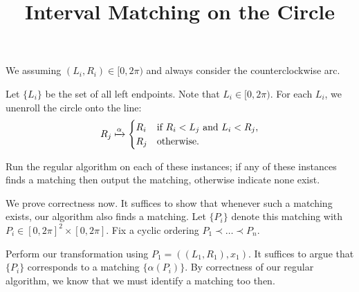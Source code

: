 \documentclass{article}
\title{Interval Matching on the Circle}
\begin{document}
\maketitle{}

We assuming $(L_i, R_i) \in [0, 2\pi)$ and always consider the counterclockwise arc.

Let $\{L_i\}$ be the set of all left endpoints. Note that $L_i \in [0, 2\pi)$. For each $L_i$, we unenroll the circle onto the line:
\begin{align*}
  R_j \xmapsto{\alpha} \begin{cases}
    R_i &\text{if } R_i < L_j \text{ and } L_i < R_j,\\
    R_j &\text{otherwise.}
  \end{cases}
\end{align*}

Run the regular algorithm on each of these instances; if any of these instances finds a matching then output the matching, otherwise indicate none exist.

We prove correctness now. It suffices to show that whenever such a matching exists, our algorithm also finds a matching. Let $\{P_i\}$ denote this matching with $P_i \in [0, 2\pi]^2 \times [0, 2\pi]$. Fix a cyclic ordering $P_1 \prec \hdots \prec P_n$.  

Perform our transformation using $P_1 = ((L_1, R_1), x_1)$. It suffices to argue that $\{P_i\}$ corresponds to a matching $\{\alpha(P_i)\}$. By correctness of our regular algorithm, we know that we must identify a matching too then. 
\end{document}
